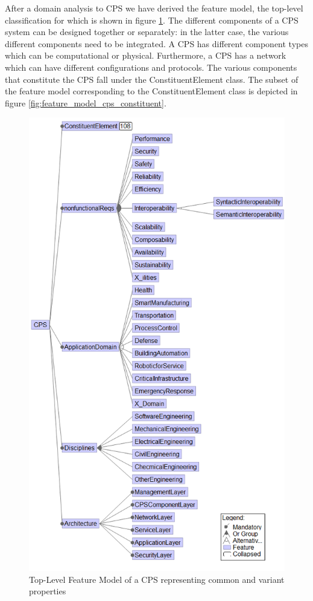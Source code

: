\documentclass[final]{include/MPM4CPS/MPM4CPS-Report} %
\newcommand{\uidx}[1]{\index[used]{#1}}  %
\begin{document}
After a domain analysis to CPS we have derived the feature model, the top-level classification for which is shown in
figure \ref{fig:feature_model_cps_top}. The different components\uidx{Component} of a CPS system can be designed together or
separately: in the latter case, the various different components need to be integrated. A CPS has different component types which can be computational or physical. Furthermore, a CPS has a network which can have different configurations and protocols.
The various components that constitute the CPS fall under the ConstituentElement class. The subset of the feature model corresponding to the ConstituentElement class is depicted in figure \ref{fig:feature_model_cps_constituent}.
\begin{figure}[!htb]
\includegraphics[width=\textwidth]{figures/cps-ontology-top.png}  %
\caption{Top-Level Feature Model of a CPS representing common and variant properties}
\label{fig:feature_model_cps_top}
\end{figure}
\end{document}
